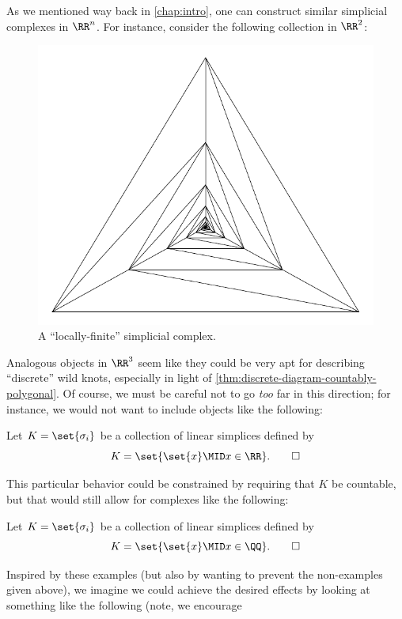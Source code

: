 As we mentioned way back in \cref{chap:intro}, one can construct
similar simplicial complexes in $\RR^n$. For instance, consider the
following collection in $\RR^2$:
\begin{figure}[H]
  \centering
  \includegraphics[scale=.5]{figures/wild/simp-comp-down.pdf}
  \caption{A ``locally-finite'' simplicial complex.}
\end{figure}
Analogous objects in $\RR^3$ seem like they could be very apt for
describing ``discrete'' wild knots, especially in light of
\cref{thm:discrete-diagram-countably-polygonal}. Of course, we must be
careful not to go \emph{too} far in this direction; for instance, we
would not want to include objects like the following:
\begin{example}
  Let $K = \set{\sigma_i}$ be a collection of linear simplices defined
  by
  \[
    K = \set{\set{x} \MID x \in \RR}. \qedhere
  \]
\end{example}
This particular behavior could be constrained by requiring that $K$ be
countable, but that would still allow for complexes like the
following:
\begin{example}
  Let $K = \set{\sigma_i}$ be a collection of linear simplices defined
  by
  \[
    K = \set{\set{x} \MID x \in \QQ}. \qedhere
  \]
\end{example}
Inspired by these examples (but also by wanting to prevent the
non-examples given above), we imagine we could achieve the desired
effects by looking at something like the following (note, we encourage
